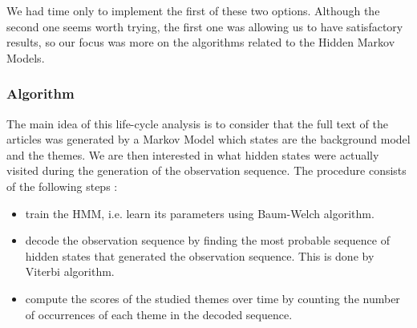 We had time only to implement the first of these two options. Although the second one seems worth trying, the first one was allowing us to have satisfactory results, so our focus was more on the algorithms related to the Hidden Markov Models.


\subsubsection*{Algorithm}
The main idea of this life-cycle analysis is to consider that the full text of the articles was generated by a Markov Model which states are the background model and the themes. We are then interested in what hidden states were actually visited during the generation of the observation sequence. The procedure consists of the following steps :

\begin{itemize}
\item train the HMM, i.e. learn its parameters using Baum-Welch algorithm.
\item decode the observation sequence by finding the most probable sequence of hidden states that generated the observation sequence. This is done by Viterbi algorithm.
\item compute the scores of the studied themes over time by counting the number of occurrences of each theme in the decoded sequence.
\end{itemize}


